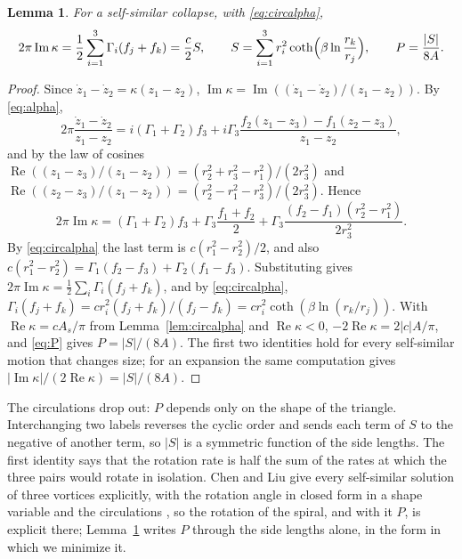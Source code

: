 \documentclass[11pt]{article}
\newtheorem{lemma}{Lemma}
\theoremstyle{definition}
\newcommand{\re}{\operatorname{Re}}
\newcommand{\im}{\operatorname{Im}}
\begin{document}
\begin{lemma}\label{lem:ratesalpha}
For a self-similar collapse, with \eqref{eq:circalpha},
\begin{equation}\label{eq:Salpha}
2\pi\im\kappa = \frac12 \sum_{i=1}^3 \Gamma_i (f_j + f_k) = \frac{c}{2} S, \qquad S = \sum_{i=1}^3 r_i^2 \coth\Bigl(\beta\ln\frac{r_k}{r_j}\Bigr), \qquad P = \frac{|S|}{8A}.
\end{equation}
\end{lemma}

\begin{proof}
Since $\dot z_1 - \dot z_2 = \kappa(z_1 - z_2)$, $\im\kappa = \im((\dot z_1 - \dot z_2)/(z_1 - z_2))$. By \eqref{eq:alpha},
\[
2\pi\frac{\dot z_1 - \dot z_2}{z_1 - z_2} = i(\Gamma_1 + \Gamma_2) f_3 + i\Gamma_3 \frac{f_2(z_1 - z_3) - f_1(z_2 - z_3)}{z_1 - z_2},
\]
and by the law of cosines $\re((z_1 - z_3)/(z_1 - z_2)) = (r_2^2 + r_3^2 - r_1^2)/(2r_3^2)$ and $\re((z_2 - z_3)/(z_1 - z_2)) = (r_2^2 - r_1^2 - r_3^2)/(2r_3^2)$. Hence
\[
2\pi\im\kappa = (\Gamma_1 + \Gamma_2) f_3 + \Gamma_3 \frac{f_1 + f_2}{2} + \Gamma_3 \frac{(f_2 - f_1)(r_2^2 - r_1^2)}{2r_3^2}.
\]
By \eqref{eq:circalpha} the last term is $c(r_1^2 - r_2^2)/2$, and also $c(r_1^2 - r_2^2) = \Gamma_1(f_2 - f_3) + \Gamma_2(f_1 - f_3)$. Substituting gives $2\pi\im\kappa = \frac12\sum_i \Gamma_i(f_j + f_k)$, and by \eqref{eq:circalpha}, $\Gamma_i(f_j + f_k) = c r_i^2 (f_j + f_k)/(f_j - f_k) = c r_i^2 \coth(\beta\ln(r_k/r_j))$. With $\re\kappa = cA_s/\pi$ from Lemma~\ref{lem:circalpha} and $\re\kappa < 0$, $-2\re\kappa = 2|c|A/\pi$, and \eqref{eq:P} gives $P = |S|/(8A)$. The first two identities hold for every self-similar motion that changes size; for an expansion the same computation gives $|\im\kappa|/(2\re\kappa) = |S|/(8A)$.
\end{proof}

The circulations drop out: $P$ depends only on the shape of the triangle. Interchanging two labels reverses the cyclic order and sends each term of $S$ to the negative of another term, so $|S|$ is a symmetric function of the side lengths. The first identity says that the rotation rate is half the sum of the rates at which the three pairs would rotate in isolation. Chen and Liu give every self-similar solution of three vortices explicitly, with the rotation angle in closed form in a shape variable and the circulations \cite[Theorems~2.1, 2.2]{cl2024}, so the rotation of the spiral, and with it $P$, is explicit there; Lemma~\ref{lem:ratesalpha} writes $P$ through the side lengths alone, in the form in which we minimize it.
\end{document}
